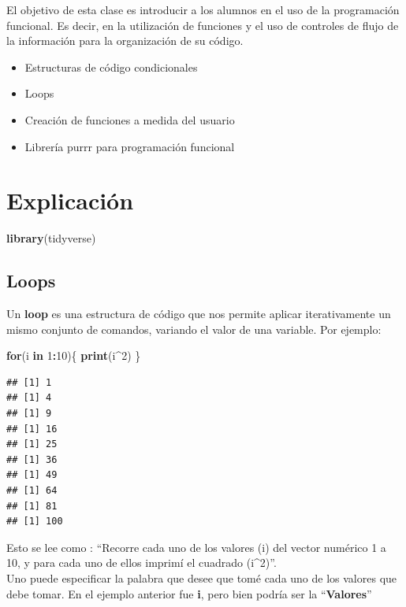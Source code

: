 \documentclass[]{book}
\newenvironment{Shaded}{\begin{snugshade}}{\end{snugshade}}
\newcommand{\ControlFlowTok}[1]{\textcolor[rgb]{0.13,0.29,0.53}{\textbf{#1}}}
\newcommand{\DecValTok}[1]{\textcolor[rgb]{0.00,0.00,0.81}{#1}}
\newcommand{\KeywordTok}[1]{\textcolor[rgb]{0.13,0.29,0.53}{\textbf{#1}}}
\newcommand{\NormalTok}[1]{#1}
\newcommand{\OperatorTok}[1]{\textcolor[rgb]{0.81,0.36,0.00}{\textbf{#1}}}
\providecommand{\tightlist}{%
  \setlength{\itemsep}{0pt}\setlength{\parskip}{0pt}}
\begin{document}
El objetivo de esta clase es introducir a los alumnos en el uso de la programación funcional. Es decir, en la utilización de funciones y el uso de controles de flujo de la información para la organización de su código.

\begin{itemize}
\tightlist
\item
  Estructuras de código condicionales
\item
  Loops
\item
  Creación de funciones a medida del usuario
\item
  Librería purrr para programación funcional
\end{itemize}

\hypertarget{explicacion-2}{%
\section{Explicación}\label{explicacion-2}}

\begin{Shaded}
\begin{Highlighting}[]
\KeywordTok{library}\NormalTok{(tidyverse)}
\end{Highlighting}
\end{Shaded}

\hypertarget{loops}{%
\subsection{Loops}\label{loops}}

Un \textbf{loop} es una estructura de código que nos permite aplicar iterativamente un mismo conjunto de comandos, variando el valor de una variable. Por ejemplo:

\begin{Shaded}
\begin{Highlighting}[]
\ControlFlowTok{for}\NormalTok{(i }\ControlFlowTok{in} \DecValTok{1}\OperatorTok{:}\DecValTok{10}\NormalTok{)\{}
   \KeywordTok{print}\NormalTok{(i}\OperatorTok{^}\DecValTok{2}\NormalTok{)}
\NormalTok{\}}
\end{Highlighting}
\end{Shaded}

\begin{verbatim}
## [1] 1
## [1] 4
## [1] 9
## [1] 16
## [1] 25
## [1] 36
## [1] 49
## [1] 64
## [1] 81
## [1] 100
\end{verbatim}

Esto se lee como : ``Recorre cada uno de los valores (i) del vector numérico 1 a 10, y para cada uno de ellos imprimí el cuadrado (i\^{}2)''.\\
Uno puede especificar la palabra que desee que tomé cada uno de los valores que debe tomar. En el ejemplo anterior fue \textbf{i}, pero bien podría ser la ``\textbf{Valores}''
\end{document}
